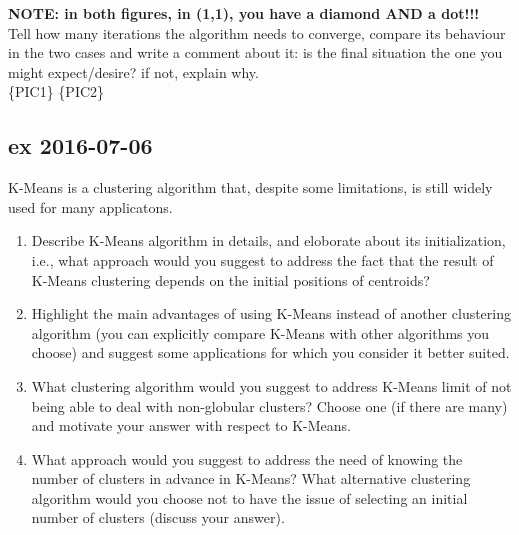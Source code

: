 \documentclass[a4paper,12pt,titlepage]{article} %
\begin{document}
\textbf{NOTE: in both figures, in (1,1), you have a diamond AND a dot!!!}\\

Tell how many iterations the algorithm needs to converge, compare its behaviour in the two cases and write a comment about it: is the final situation the one you might expect/desire? if not, explain why.\\

\{PIC1\} \{PIC2\}

\subsection{ex 2016-07-06}
K-Means is a clustering algorithm that, despite some limitations, is still widely used for many applicatons.
\begin{enumerate}
\item Describe K-Means algorithm in details, and eloborate about its initialization, i.e., what approach would you suggest to address the fact that the result of K-Means clustering depends on the initial positions of centroids?
\item Highlight the main advantages of using K-Means instead of another clustering algorithm (you can explicitly compare K-Means with other algorithms you choose) and suggest some applications for which you consider it better suited.
\item What clustering algorithm would you suggest to address K-Means limit of not being able to deal with non-globular clusters? Choose one (if there are many) and motivate your answer with respect to K-Means.
\item What approach would you suggest to address the need of knowing the number of clusters in advance in K-Means? What alternative clustering algorithm would you choose not to have the issue of selecting an initial number of clusters (discuss your answer).
\end{enumerate}
\end{document}
